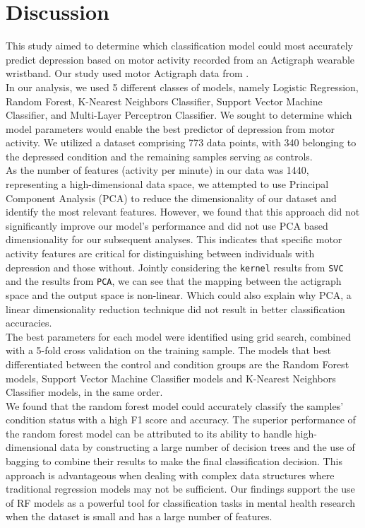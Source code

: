 \documentclass[11pt,a4paper]{article}
\newcommand{\noi}{\noindent}
\begin{document}
\section{Discussion}
This study aimed to determine which classification model could most accurately predict depression based on motor activity recorded from an Actigraph wearable wristband. Our study used motor Actigraph data from \cite{garcia2018depresjon}. \\

\noi
In our analysis, we used 5 different classes of models, namely Logistic Regression, Random Forest, K-Nearest Neighbors Classifier, Support Vector Machine Classifier, and Multi-Layer Perceptron Classifier. We sought to determine which model parameters would enable the best predictor of depression from motor activity. We utilized a dataset comprising 773 data points, with 340 belonging to the depressed condition and the remaining samples serving as controls. \\

\noi
As the number of features (activity per minute) in our data was 1440, representing a high-dimensional data space, we attempted to use Principal Component Analysis (PCA) to reduce the dimensionality of our dataset and identify the most relevant features. However, we found that this approach did not significantly improve our model's performance and did not use PCA based dimensionality for our subsequent analyses. This indicates that specific motor activity features are critical for distinguishing between individuals with depression and those without. Jointly considering the \texttt{kernel} results from \texttt{SVC} and the results from \texttt{PCA}, we can see that the mapping between the actigraph space and the output space is non-linear. Which could also explain why PCA, a linear dimensionality reduction technique did not result in better classification accuracies.\\

\noi
The best parameters for each model were identified using grid search, combined with a 5-fold cross validation on the training sample. The models that best differentiated between the control and condition groups are the Random Forest models, Support Vector Machine Classifier models and K-Nearest Neighbors Classifier models, in the same order. \\

\noi
We found that the random forest model could accurately classify the samples' condition status with a high F1 score and accuracy. The superior performance of the random forest model can be attributed to its ability to handle high-dimensional data by constructing a large number of decision trees and the use of bagging to combine their results to make the final classification decision. This approach is advantageous when dealing with complex data structures where traditional regression models may not be sufficient. Our findings support the use of RF models as a powerful tool for classification tasks in mental health research when the dataset is small and has a large number of features. \\
\end{document}
